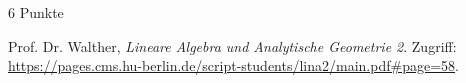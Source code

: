 \documentclass{problemset}
\begin{document}
\begin{problem}{6 Punkte}
\begin{thebibliography}{1}
    Prof. Dr. Walther, \emph{Lineare Algebra und Analytische Geometrie 2}.
    Zugriff: \url{https://pages.cms.hu-berlin.de/script-students/lina2/main.pdf#page=58}.
\end{thebibliography}
\end{problem}
\end{document}

